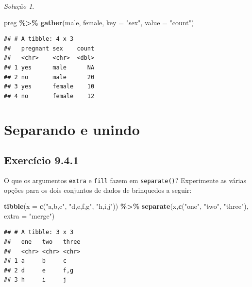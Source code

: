 \documentclass[
]{latex/krantz}
\newenvironment{Shaded}{\begin{snugshade}}{\end{snugshade}}
\newcommand{\AttributeTok}[1]{\textcolor[rgb]{0.13,0.29,0.53}{#1}}
\newcommand{\FunctionTok}[1]{\textcolor[rgb]{0.13,0.29,0.53}{\textbf{#1}}}
\newcommand{\NormalTok}[1]{#1}
\newcommand{\SpecialCharTok}[1]{\textcolor[rgb]{0.81,0.36,0.00}{\textbf{#1}}}
\newcommand{\StringTok}[1]{\textcolor[rgb]{0.31,0.60,0.02}{#1}}
\theoremstyle{definition}
\theoremstyle{definition}
\theoremstyle{definition}
\theoremstyle{definition}
\theoremstyle{remark}
\newtheorem*{solution}{Solução}
\begin{document}
\begin{solution}
\leavevmode

\begin{Shaded}
\begin{Highlighting}[]
\NormalTok{preg }\SpecialCharTok{\%\textgreater{}\%}
  \FunctionTok{gather}\NormalTok{(male, female, }\AttributeTok{key =} \StringTok{"sex"}\NormalTok{, }\AttributeTok{value =} \StringTok{"count"}\NormalTok{)}
\end{Highlighting}
\end{Shaded}

\begin{verbatim}
## # A tibble: 4 x 3
##   pregnant sex    count
##   <chr>    <chr>  <dbl>
## 1 yes      male      NA
## 2 no       male      20
## 3 yes      female    10
## 4 no       female    12
\end{verbatim}

\end{solution}

\hypertarget{separando-e-unindo}{%
\section{Separando e unindo}\label{separando-e-unindo}}

\hypertarget{exr9-4-1}{%
\subsection*{Exercício 9.4.1}\label{exr9-4-1}}

O que os argumentos \texttt{extra} e \texttt{fill} fazem em \texttt{separate()}? Experimente as várias opções para os dois conjuntos de dados de brinquedos a seguir:

\begin{Shaded}
\begin{Highlighting}[]
\FunctionTok{tibble}\NormalTok{(}\AttributeTok{x =} \FunctionTok{c}\NormalTok{(}\StringTok{"a,b,c"}\NormalTok{, }\StringTok{"d,e,f,g"}\NormalTok{, }\StringTok{"h,i,j"}\NormalTok{)) }\SpecialCharTok{\%\textgreater{}\%}
  \FunctionTok{separate}\NormalTok{(x,}\FunctionTok{c}\NormalTok{(}\StringTok{"one"}\NormalTok{, }\StringTok{"two"}\NormalTok{, }\StringTok{"three"}\NormalTok{), }\AttributeTok{extra =} \StringTok{"merge"}\NormalTok{)}
\end{Highlighting}
\end{Shaded}

\begin{verbatim}
## # A tibble: 3 x 3
##   one   two   three
##   <chr> <chr> <chr>
## 1 a     b     c    
## 2 d     e     f,g  
## 3 h     i     j
\end{verbatim}
\end{document}
